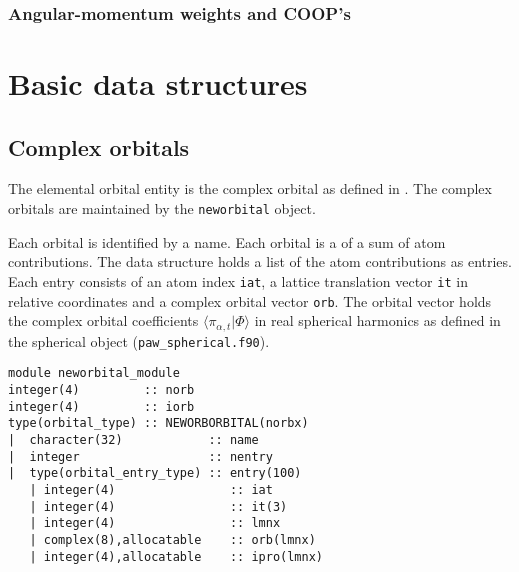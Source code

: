 \documentclass[11pt,a4paper]{report}
\begin{document}
\subsubsection{Angular-momentum weights and COOP's}


\section{Basic data structures}
\subsection{Complex orbitals}
The elemental orbital entity is the complex orbital as defined in
.  The complex orbitals are maintained by the
\verb|neworbital| object.

Each orbital is identified by a name.  Each orbital is a of a sum of
atom contributions.  The data structure holds a list of the atom
contributions as entries.  Each entry consists of an atom index
\verb|iat|, a lattice translation vector \verb|it| in relative
coordinates and a complex orbital vector \verb|orb|.  The orbital
vector holds the complex orbital coefficients
$\langle\pi_{\alpha,t}|\Phi\rangle$ in real spherical harmonics as
defined in the spherical object (\verb|paw_spherical.f90|).

\begin{verbatim}
module neworbital_module
integer(4)         :: norb
integer(4)         :: iorb
type(orbital_type) :: NEWORBORBITAL(norbx)
|  character(32)            :: name
|  integer                  :: nentry
|  type(orbital_entry_type) :: entry(100)
   | integer(4)                :: iat
   | integer(4)                :: it(3)
   | integer(4)                :: lmnx
   | complex(8),allocatable    :: orb(lmnx)
   | integer(4),allocatable    :: ipro(lmnx)
\end{verbatim}

\end{document}
